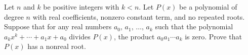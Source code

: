 Let $n$ and $k$ be positive integers with $k<n$. Let $P(x)$ be a polynomial of degree $n$ with real coefficients, nonzero constant term, and no repeated roots. Suppose that for any real numbers $a_0,\,a_1,\,\ldots,\,a_k$ such that the polynomial $a_kx^k+\cdots+a_1x+a_0$ divides $P(x)$, the product $a_0a_1\cdots a_k$ is zero. Prove that $P(x)$ has a nonreal root.
